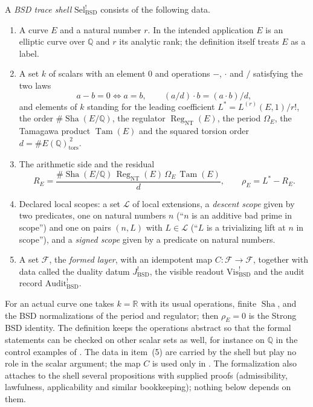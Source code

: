 \documentclass[11pt]{article}
\theoremstyle{definition}
\newcommand{\Q}{\mathbb{Q}}
\newcommand{\R}{\mathbb{R}}
\newcommand{\Sha}{\operatorname{Sha}}
\newcommand{\Reg}{\operatorname{Reg}}
\newcommand{\Tam}{\operatorname{Tam}}
\newcommand{\tors}{\operatorname{tors}}
\newcommand{\SelBSD}{\mathrm{Sel}^{!}_{\mathrm{BSD}}}   \newcommand{\rhoE}{\rho_E}                              \newcommand{\PiBSD}{\Pi_{\mathrm{BSD}}}                 \newcommand{\GammaPD}{\Gamma_{\mathrm{BSD}}^{\mathrm{padic\text{-}descent}}}
\begin{document}
\begin{definition}\label{def:closure:sel-bsd-shell}
A \emph{BSD trace shell} $\SelBSD$ consists of the following data.
\begin{enumerate}
\item A curve $E$ and a natural number $r$.  In the intended application
  $E$ is an elliptic curve over $\Q$ and $r$ its analytic rank; the
  definition itself treats $E$ as a label.
\item A set $k$ of scalars with an element $0$ and operations $-$,
  $\cdot$ and $/$ satisfying the two laws
  \[
    a-b=0\iff a=b,
    \qquad
    (a/d)\cdot b=(a\cdot b)/d ,
  \]
  and elements of $k$ standing for the leading coefficient
  $L^*=L^{(r)}(E,1)/r!$, the order $\#\Sha(E/\Q)$, the regulator
  $\Reg_{\mathrm{NT}}(E)$, the period $\Omega_E$, the Tamagawa product
  $\Tam(E)$ and the squared torsion order $d=\#E(\Q)_{\tors}^{\,2}$.
\item The arithmetic side and the residual
  \[
    R_E=\frac{\#\Sha(E/\Q)\,\Reg_{\mathrm{NT}}(E)\,\Omega_E\,\Tam(E)}{d},
    \qquad
    \rhoE=L^*-R_E .
  \]
\item Declared local scopes: a set $\mathcal L$ of local extensions, a
  \emph{descent scope} given by two predicates, one on natural numbers $n$
  (``$n$ is an additive bad prime in scope'') and one on pairs $(n,L)$
  with $L\in\mathcal L$ (``$L$ is a trivializing lift at $n$ in scope''),
  and a \emph{signed scope} given by a predicate on natural numbers.
\item A set $\mathcal F$, the \emph{formed layer}, with an idempotent map
  $C:\mathcal F\to\mathcal F$, together with data called the duality
  datum $J^{!}_{\mathrm{BSD}}$, the visible readout
  $\mathrm{Vis}^{!}_{\mathrm{BSD}}$ and the audit record
  $\mathrm{Audit}^{!}_{\mathrm{BSD}}$.
\end{enumerate}
\end{definition}

For an actual curve one takes $k=\R$ with its usual operations, finite
$\Sha$, and the BSD normalizations of the period and regulator; then
$\rhoE=0$ is the Strong BSD identity.  The definition keeps the
operations abstract so that the formal statements can be checked on
other scalar sets as well, for instance on $\Q$ in the control examples
of .  The data in item~(5) are carried by the shell but
play no role in the scalar argument; the map $C$ is used only in
.  The formalization also attaches
to the shell several propositions with supplied proofs (admissibility,
lawfulness, applicability and similar bookkeeping); nothing below depends
on them.
\end{document}
